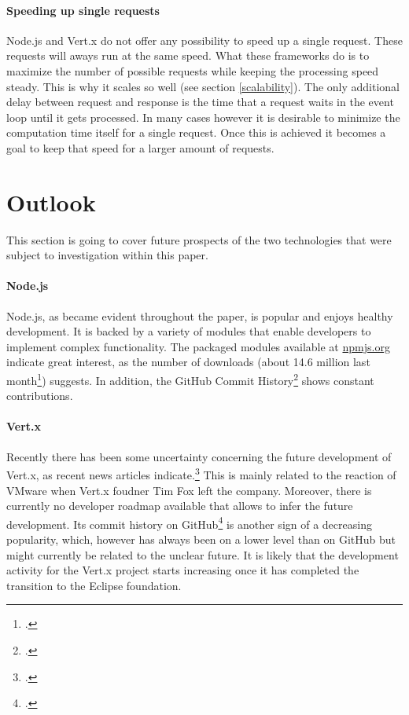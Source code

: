 \paragraph{Speeding up single requests}
Node.js and Vert.x do not offer any possibility to speed up a single request.
These requests will aways run at the same speed. What these frameworks do is to
maximize the number of possible requests while keeping the processing speed
steady. This is why it scales so well (see section \ref{scalability}). The only
additional delay between request and response is the time that a request waits
in the event loop until it gets processed.  In many cases however it is
desirable to minimize the computation time itself for a single request. Once
this is achieved it becomes a goal to keep that speed for a larger amount of
requests.\\

\newpage
\section{Outlook}

This section is going to cover future prospects of the two technologies that were subject to investigation within this paper.

\paragraph{Node.js} Node.js, as became evident throughout the paper, is popular and enjoys healthy development. It is backed by a variety of modules that enable developers to implement complex functionality. The packaged modules available at \url{npmjs.org} indicate great interest, as the number of downloads (about 14.6 million last month\footcite[Cf.][]{node_packages}) suggests. In addition, the GitHub Commit History\footcite[Cf.][]{vertxcommithistory_2013} shows constant contributions. 

\paragraph{Vert.x} Recently there has been some uncertainty concerning the future
development of Vert.x, as recent news articles
indicate.\footcite[Cf.][]{Asay_2013} This is mainly related to the reaction of
VMware when Vert.x foudner Tim Fox left the company. Moreover, there is
currently no developer roadmap available that allows to infer the future
development. Its commit history on
GitHub\footcite[Cf.][]{vertxcommithistory_2013} is another sign of a decreasing
popularity, which, however has always been on a lower level than on GitHub but
might currently be related to the unclear future. It is likely that the development
activity for the Vert.x project starts increasing once it has completed the transition
 to the Eclipse foundation.

